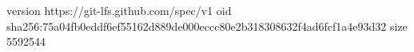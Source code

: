 version https://git-lfs.github.com/spec/v1
oid sha256:75a04fb0eddf6ef55162d889de000eccc80e2b318308632f4ad6fcf1a4e93d32
size 5592544
